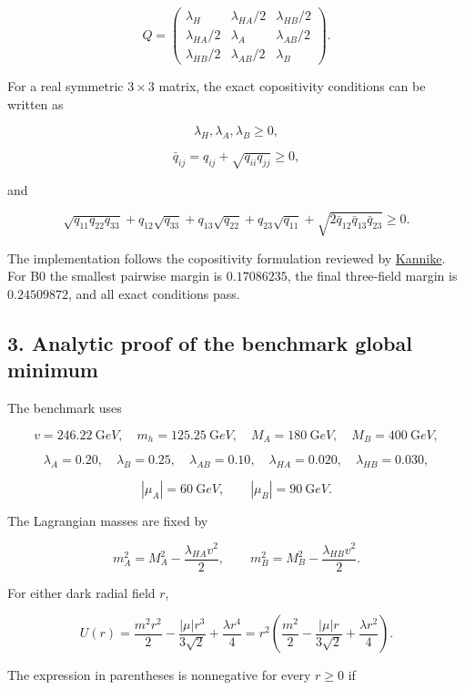 \documentclass[
]{article}
\begin{document}
\[
Q=\begin{pmatrix}
\lambda_H&\lambda_{HA}/2&\lambda_{HB}/2\\
\lambda_{HA}/2&\lambda_A&\lambda_{AB}/2\\
\lambda_{HB}/2&\lambda_{AB}/2&\lambda_B
\end{pmatrix}.
\]

For a real symmetric \(3\times3\) matrix, the exact copositivity
conditions can be written as

\[
\lambda_H,\lambda_A,\lambda_B\ge0,
\]

\[
\bar q_{ij}=q_{ij}+\sqrt{q_{ii}q_{jj}}\ge0,
\]

and

\[
\sqrt{q_{11}q_{22}q_{33}}
+q_{12}\sqrt{q_{33}}+q_{13}\sqrt{q_{22}}+q_{23}\sqrt{q_{11}}
+\sqrt{2\bar q_{12}\bar q_{13}\bar q_{23}}\ge0.
\]

The implementation follows the copositivity formulation reviewed by
\href{https://arxiv.org/abs/1205.3781}{Kannike}. For B0 the smallest
pairwise margin is \(0.17086235\), the final three-field margin is
\(0.24509872\), and all exact conditions pass.

\hypertarget{analytic-proof-of-the-benchmark-global-minimum}{%
\subsection{3. Analytic proof of the benchmark global
minimum}\label{analytic-proof-of-the-benchmark-global-minimum}}

The benchmark uses

\[
v=246.22\ {\mathrm GeV},\quad m_h=125.25\ {\mathrm GeV},\quad
M_A=180\ {\mathrm GeV},\quad M_B=400\ {\mathrm GeV},
\]

\[
\lambda_A=0.20,\quad\lambda_B=0.25,\quad\lambda_{AB}=0.10,
\quad\lambda_{HA}=0.020,\quad\lambda_{HB}=0.030,
\]

\[
|\mu_A|=60\ {\mathrm GeV},\qquad |\mu_B|=90\ {\mathrm GeV}.
\]

The Lagrangian masses are fixed by

\[
m_A^2=M_A^2-\frac{\lambda_{HA}v^2}{2},\qquad
m_B^2=M_B^2-\frac{\lambda_{HB}v^2}{2}.
\]

For either dark radial field \(r\),

\[
U(r)=\frac{m^2r^2}{2}-\frac{|\mu|r^3}{3\sqrt2}+\frac{\lambda r^4}{4}
=r^2\left(\frac{m^2}{2}-\frac{|\mu|r}{3\sqrt2}+\frac{\lambda r^2}{4}\right).
\]

The expression in parentheses is nonnegative for every \(r\ge0\) if
\end{document}
